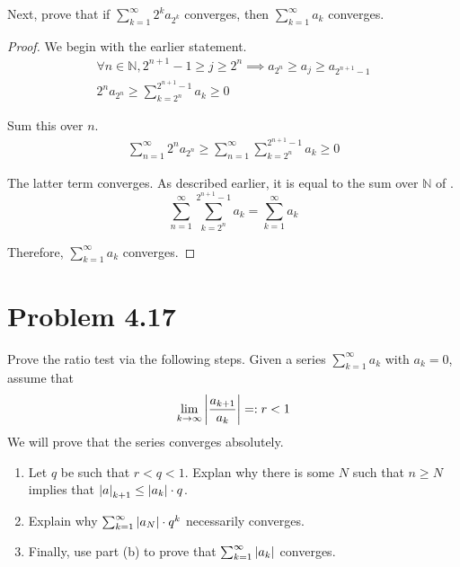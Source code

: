 \documentclass[12pt]{report}
\begin{document}
        Next, prove that if $\sum_{k=1}^{\infty} 2^k a_{2^k}$ converges, then $\sum_{k=1}^{\infty} a_k$ converges.
        \begin{proof}
            We begin with the earlier statement.
            \begin{gather}
                \forall n \in \mathbb{N}, 2^{n+1} - 1 \geq j \geq 2^n \implies a_{2^n} \geq a_j \geq a_{2^{n+1} - 1}\\
                2^{n} a_{2^{n}} \geq \sum_{k=2^n}^{2^{n+1} - 1} a_k \geq 0
            \end{gather}

            Sum this over $n$.
            \begin{gather}
                \sum_{n=1}^{\infty} 2^{n} a_{2^{n}} \geq \sum_{n=1}^{\infty} \sum_{k=2^n}^{2^{n+1} - 1} a_k \geq 0
            \end{gather}

            The latter term converges. 
            As described earlier, it is equal to the sum over $\mathbb{N}$ of .
            \begin{equation}
                \sum_{n=1}^{\infty} \sum_{k=2^n}^{2^{n+1} - 1} a_k = \sum_{k=1}^{\infty} a_k
            \end{equation}

            Therefore, $\sum_{k=1}^{\infty} a_k$ converges.
        \end{proof}
    \pagebreak

\section{Problem 4.17}
    Prove the ratio test via the following steps. 
    Given a series $\sum_{k = 1}^{\infty} a_k$ with $a_k = 0$, assume that 
    \begin{equation*}
        \lim_{k \to \infty} \left| \frac{a_{k+1}}{a_{k}} \right| =: r < 1
    \end{equation*}
    We will prove that the series converges absolutely.
    \begin{enumerate}[label=(\alph*)]
        \item   Let $q$ be such that $r < q < 1$. Explan why there is some $N$ such that $n \geq N$ implies that $\left| a \right|_{k+1} \leq \left| a_k \right| \cdot q$.
        \item   Explain why $\sum_{k = 1}^{\infty} \left| a_N \right| \cdot q^k$ necessarily converges.
        \item   Finally, use part (b) to prove that $\sum_{k = 1}^{\infty} \left| a_k \right|$ converges.
    \end{enumerate}
    \pagebreak
\end{document}
